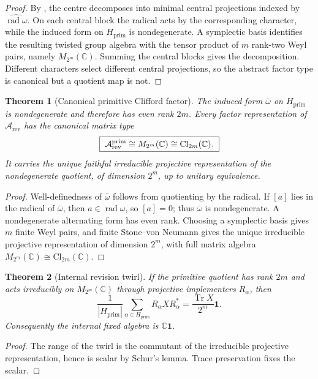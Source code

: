 \documentclass[11pt]{article}
\newtheorem{theorem}{Theorem}[section]
\theoremstyle{definition}
\theoremstyle{remark}
\newcommand{\C}{\mathbb{C}}
\newcommand{\Arev}{\mathcal{A}_{\mathrm{rev}}}
\newcommand{\Cl}{\mathrm{Cl}}
\newcommand{\rad}{\operatorname{rad}}
\newcommand{\Tr}{\operatorname{Tr}}
\newcommand{\one}{\mathbf{1}}
\newcommand{\Hprim}{H_{\mathrm{prim}}}
\begin{document}
\begin{proof}
By , the centre decomposes into minimal central
projections indexed by \(\widehat{\rad\omega}\).  On each central block the
radical acts by the corresponding character, while the induced form on
\(\Hprim\) is nondegenerate.  A symplectic basis identifies the resulting
twisted group algebra with the tensor product of \(m\) rank-two Weyl pairs,
namely \(M_{2^m}(\C)\).  Summing the central blocks gives the decomposition.
Different characters select different central projections, so the abstract
factor type is canonical but a quotient map is not.
\end{proof}

\begin{theorem}[Canonical primitive Clifford factor]
\label{thm:primitivity-canonical}
The induced form \(\bar\omega\) on \(\Hprim\) is nondegenerate and therefore has
even rank \(2m\).  Every factor representation of \(\Arev\) has the canonical
matrix type
\[
  \boxed{\ \Arev^{\rm prim}\cong M_{2^m}(\C)\cong\Cl_{2m}(\C).\ }
\]
It carries the unique faithful irreducible projective representation of the
nondegenerate quotient, of dimension \(2^m\), up to unitary equivalence.
\end{theorem}

\begin{proof}
Well-definedness of \(\bar\omega\) follows from quotienting by the radical.  If
\([a]\) lies in the radical of \(\bar\omega\), then \(a\in\rad\omega\), so
\([a]=0\); thus \(\bar\omega\) is nondegenerate.  A nondegenerate alternating
form has even rank.  Choosing a symplectic basis gives \(m\) finite Weyl pairs,
and finite Stone--von Neumann gives the unique irreducible projective
representation of dimension \(2^m\), with full matrix algebra
\(M_{2^m}(\C)\cong\Cl_{2m}(\C)\).
\end{proof}

\begin{theorem}[Internal revision twirl]
\label{thm:revision-twirl-main}
If the primitive quotient has rank \(2m\) and acts irreducibly on
\(M_{2^m}(\C)\) through projective implementers \(R_\alpha\), then
\[
  \frac1{|\Hprim|}\sum_{\alpha\in\Hprim}R_\alpha X R_\alpha^*
  =\frac{\Tr X}{2^m}\one.
\]
Consequently the internal fixed algebra is \(\C\one\).
\end{theorem}

\begin{proof}
The range of the twirl is the commutant of the irreducible projective
representation, hence is scalar by Schur's lemma.  Trace preservation fixes the
scalar.
\end{proof}
\end{document}
